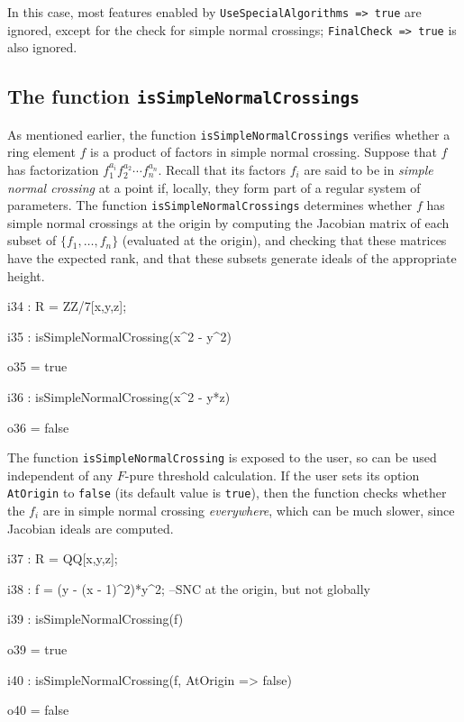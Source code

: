 \documentclass{amsart}
\begin{document}
\noindent In this case, most features enabled by \texttt{UseSpecialAlgorithms => true}
are ignored, except for the check for simple normal crossings;  \texttt{FinalCheck => true}
is also ignored.

\subsection{The function \texttt{isSimpleNormalCrossings}} \label{subsec.SNC}
As mentioned earlier, the function \texttt{isSimpleNormalCrossings} verifies whether a ring element $f$ is a product of factors in simple normal crossing.
Suppose that $f$ has factorization $f_1^{a_i} f_2^{a_2} \cdots f_n^{a_n}$.  Recall that its factors $f_i$ are said to be in
\emph{simple normal crossing} at a point if, locally, they form part of a regular system of parameters.  The function \texttt{isSimpleNormalCrossings} determines whether $f$ has simple normal crossings at the origin by computing the Jacobian matrix of each subset of $\{ f_1, \ldots, f_n \}$ (evaluated at the origin), and checking that these matrices have the expected rank, and that these subsets generate ideals of the appropriate height.

\smallskip
{\small
{}
\begin{MyVerbatim}
i34 : R = ZZ/7[x,y,z];

i35 : isSimpleNormalCrossing(x^2 - y^2)

o35 = true

i36 : isSimpleNormalCrossing(x^2 - y*z)

o36 = false
\end{MyVerbatim}
}
\smallskip

The function \texttt{isSimpleNormalCrossing} is exposed to the user, so can be used independent of any $F$-pure threshold calculation.
If the user sets its option \texttt{AtOrigin} to \texttt{false} (its default value is \texttt{true}), then the function checks whether the $f_i$ are in simple normal crossing \emph{everywhere}, which can be much slower, since Jacobian ideals are computed.

\smallskip
{\small
{}
\begin{MyVerbatim}
i37 : R = QQ[x,y,z];

i38 : f = (y - (x - 1)^2)*y^2; --SNC at the origin, but not globally

i39 : isSimpleNormalCrossing(f)

o39 = true

i40 : isSimpleNormalCrossing(f, AtOrigin => false)

o40 = false
\end{MyVerbatim}
}
\smallskip
\end{document}
